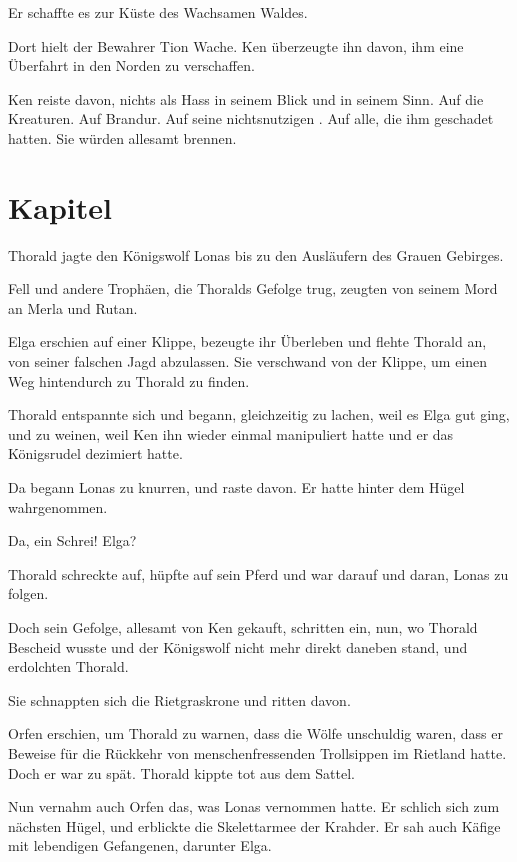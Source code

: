 Er schaffte es zur Küste des Wachsamen Waldes.

Dort hielt der Bewahrer Tion Wache. Ken überzeugte ihn davon, ihm eine Überfahrt in den Norden zu verschaffen.

Ken reiste davon, nichts als Hass in seinem Blick und in seinem Sinn. Auf die Kreaturen. Auf Brandur. Auf seine nichtsnutzigen . Auf alle, die ihm geschadet hatten. Sie würden allesamt brennen.




\newpage
\section{Kapitel}

Thorald jagte den Königswolf Lonas bis zu den Ausläufern des Grauen Gebirges.

Fell und andere Trophäen, die Thoralds Gefolge trug, zeugten von seinem Mord an Merla und Rutan.

Elga erschien auf einer Klippe, bezeugte ihr Überleben und flehte Thorald an, von seiner falschen Jagd abzulassen. Sie verschwand von der Klippe, um einen Weg hintendurch zu Thorald zu finden.

Thorald entspannte sich und begann, gleichzeitig zu lachen, weil es Elga gut ging, und zu weinen, weil Ken ihn wieder einmal manipuliert hatte und er das Königsrudel dezimiert hatte.

Da begann Lonas zu knurren, und raste davon. Er hatte  hinter dem Hügel wahrgenommen.

Da, ein Schrei! Elga?

Thorald schreckte auf, hüpfte auf sein Pferd und war darauf und daran, Lonas zu folgen. 

Doch sein Gefolge, allesamt von Ken gekauft, schritten ein, nun, wo Thorald Bescheid wusste und der Königswolf nicht mehr direkt daneben stand, und erdolchten Thorald.

Sie schnappten sich die Rietgraskrone und ritten davon.

Orfen erschien, um Thorald zu warnen, dass die Wölfe unschuldig waren, dass er Beweise für die Rückkehr von menschenfressenden Trollsippen im Rietland hatte. Doch er war zu spät. Thorald kippte tot aus dem Sattel.

Nun vernahm auch Orfen das, was Lonas vernommen hatte. Er schlich sich zum nächsten Hügel, und erblickte die Skelettarmee der Krahder. Er sah auch Käfige mit lebendigen Gefangenen, darunter Elga.

